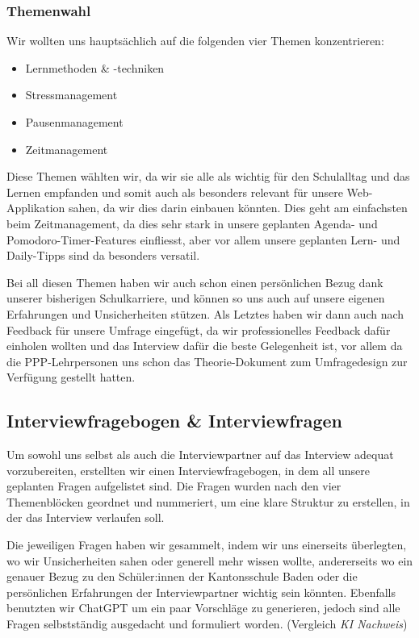 \documentclass[12pt,a4paper]{report}
\begin{document}
\subsubsection {Themenwahl}
Wir wollten uns hauptsächlich auf die folgenden vier Themen konzentrieren:
\begin{itemize}
    \item Lernmethoden \& -techniken
    \item Stressmanagement
    \item Pausenmanagement
    \item Zeitmanagement
\end{itemize}

Diese Themen wählten wir, da wir sie alle als wichtig für den Schulalltag und das Lernen empfanden und somit auch als besonders relevant für unsere Web-Applikation sahen,
da wir dies darin einbauen könnten. Dies geht am einfachsten beim Zeitmanagement, da dies sehr stark in unsere geplanten Agenda- und Pomodoro-Timer-Features einfliesst, aber vor allem unsere geplanten Lern- und Daily-Tipps sind da besonders versatil.


Bei all diesen Themen haben wir auch schon einen persönlichen Bezug dank unserer bisherigen Schulkarriere, und können so uns auch auf unsere eigenen Erfahrungen und Unsicherheiten stützen.
Als Letztes haben wir dann auch nach Feedback für unsere Umfrage eingefügt, da wir professionelles Feedback dafür einholen wollten und das Interview dafür die beste Gelegenheit ist, vor allem da die PPP-Lehrpersonen uns schon das Theorie-Dokument zum Umfragedesign zur Verfügung gestellt hatten.

\subsection {Interviewfragebogen \& Interviewfragen}
Um sowohl uns selbst als auch die Interviewpartner auf das Interview adequat vorzubereiten, erstellten wir einen Interviewfragebogen, in dem all unsere geplanten Fragen aufgelistet sind.
Die Fragen wurden nach den vier Themenblöcken geordnet und nummeriert, um eine klare Struktur zu erstellen, in der das Interview verlaufen soll.

Die jeweiligen Fragen haben wir gesammelt, indem wir uns einerseits überlegten, wo wir Unsicherheiten sahen oder generell mehr wissen wollte, andererseits wo ein genauer Bezug zu den Schüler:innen der Kantonsschule Baden oder die persönlichen Erfahrungen der Interviewpartner wichtig sein könnten. 
Ebenfalls benutzten wir ChatGPT um ein paar Vorschläge zu generieren, jedoch sind alle Fragen selbstständig ausgedacht und formuliert worden. (Vergleich \textit{KI Nachweis}) 
\end{document}
